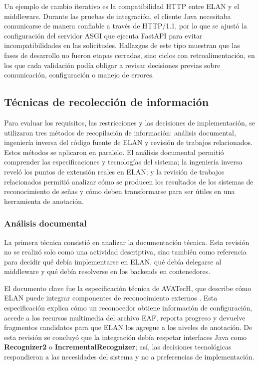 Un ejemplo de cambio iterativo es la compatibilidad HTTP entre ELAN y el middleware. Durante las pruebas de integración, el cliente Java necesitaba comunicarse de manera confiable a través de HTTP/1.1, por lo que se ajustó la configuración del servidor ASGI que ejecuta FastAPI para evitar incompatibilidades en las solicitudes. Hallazgos de este tipo muestran que las fases de desarrollo no fueron etapas cerradas, sino ciclos con retroalimentación, en los que cada validación podía obligar a revisar decisiones previas sobre comunicación, configuración o manejo de errores.

\subsection{Técnicas de recolección de información}

Para evaluar los requisitos, las restricciones y las decisiones de implementación, se utilizaron tres métodos de recopilación de información: análisis documental, ingeniería inversa del código fuente de ELAN y revisión de trabajos relacionados. Estos métodos se aplicaron en paralelo. El análisis documental permitió comprender las especificaciones y tecnologías del sistema; la ingeniería inversa reveló los puntos de extensión reales en ELAN; y la revisión de trabajos relacionados permitió analizar cómo se producen los resultados de los sistemas de reconocimiento de señas y cómo deben transformarse para ser útiles en una herramienta de anotación.

\subsubsection{Análisis documental}

La primera técnica consistió en analizar la documentación técnica. Esta revisión no se realizó solo como una actividad descriptiva, sino también como referencia para decidir qué debía implementarse en ELAN, qué debía delegarse al middleware y qué debía resolverse en los backends en contenedores.

El documento clave fue la especificación técnica de AVATecH, que describe cómo ELAN puede integrar componentes de reconocimiento externos \cite{auer2014avatech}. Esta especificación explica cómo un reconocedor obtiene información de configuración, accede a los recursos multimedia del archivo EAF, reporta progreso y devuelve fragmentos candidatos para que ELAN los agregue a los niveles de anotación. De esta revisión se concluyó que la integración debía respetar interfaces Java como \textbf{Recognizer2} o \textbf{IncrementalRecognizer}; así, las decisiones tecnológicas respondieron a las necesidades del sistema y no a preferencias de implementación.

